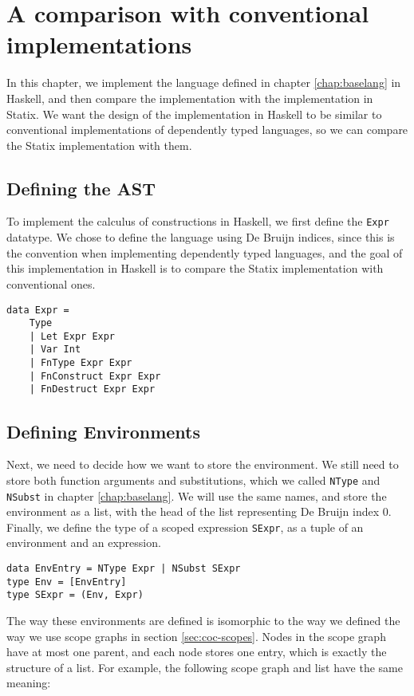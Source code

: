 \chapter{A comparison with conventional implementations}
\label{ch:comp-haskell}

In this chapter, we implement the language defined in chapter \ref{chap:baselang} in Haskell, and then compare the implementation with the implementation in Statix. We want the design of the implementation in Haskell to be similar to conventional implementations of dependently typed languages, so we can compare the Statix implementation with them.

\section{Defining the AST}
To implement the calculus of constructions in Haskell, we first define the \verb|Expr| datatype. We chose to define the language using De Bruijn indices, since this is the convention when implementing dependently typed languages, and the goal of this implementation in Haskell is to compare the Statix implementation with conventional ones. 
\begin{lstlisting}
data Expr =
	Type
	| Let Expr Expr
	| Var Int
	| FnType Expr Expr
	| FnConstruct Expr Expr
	| FnDestruct Expr Expr
\end{lstlisting}

\section{Defining Environments}

Next, we need to decide how we want to store the environment. We still need to store both function arguments and substitutions, which we called \verb|NType| and \verb|NSubst| in chapter \ref{chap:baselang}. We will use the same names, and store the environment as a list, with the head of the list representing De Bruijn index 0. Finally, we define the type of a scoped expression \verb|SExpr|, as a tuple of an environment and an expression.
\begin{lstlisting}
data EnvEntry = NType Expr | NSubst SExpr
type Env = [EnvEntry]
type SExpr = (Env, Expr)
\end{lstlisting}

The way these environments are defined is isomorphic to the way we defined the way we use scope graphs in section \ref{sec:coc-scopes}. Nodes in the scope graph have at most one parent, and each node stores one entry, which is exactly the structure of a list. For example, the following scope graph and list have the same meaning:

